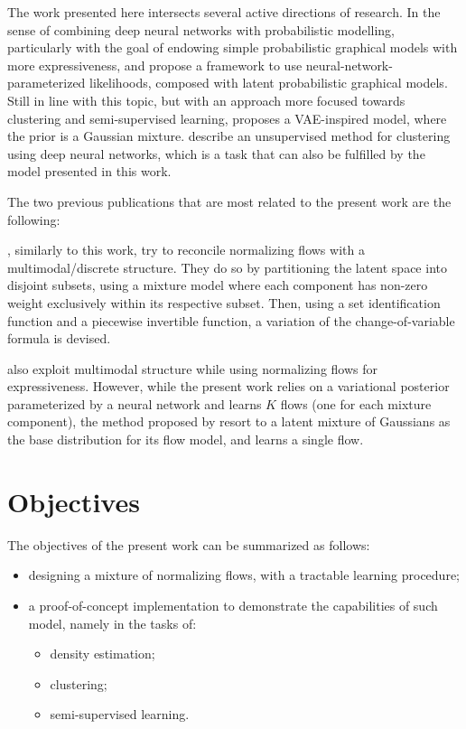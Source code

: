 The work presented here intersects several active directions of research.
In the sense of combining deep neural networks with probabilistic modelling,
particularly with the goal of endowing simple probabilistic graphical models
with more expressiveness, \textcite{svae} and \textcite{lin2018variational} propose a
framework to use neural-network-parameterized likelihoods, composed with latent
probabilistic graphical models. Still in line with this topic, but with an
approach more focused towards clustering and semi-supervised learning, \textcite{gmVAE}
proposes a VAE-inspired model, where the prior is a Gaussian mixture. \textcite{DEC}
describe an unsupervised method for clustering using deep neural networks, which
is a task that can also be fulfilled by the model presented in this work.

The two previous publications that are most related to the present work are
the following:

\textcite{RAD}, similarly to this work, try to reconcile normalizing flows with a
multimodal/discrete structure. They do so by partitioning the latent space into
disjoint subsets, using a mixture model where each component has non-zero
weight exclusively within its respective subset. Then, using a set identification
function and a piecewise invertible function, a variation of the change-of-variable
formula is devised.

\textcite{semisuplearning_nflows} also exploit multimodal structure while
using normalizing flows for expressiveness. However, while the present work relies on
a variational posterior parameterized by a neural network and learns $K$ flows
(one for each mixture component), the method proposed by \textcite{semisuplearning_nflows} resort to a
latent mixture of Gaussians as the base distribution for its flow model, and
learns a single flow.

\section{Objectives}
\label{section:objectives}

The objectives of the present work can be summarized as follows:
\begin{itemize}
    \item designing a mixture of normalizing flows, with a tractable learning procedure;
    \item a proof-of-concept implementation to demonstrate the capabilities of such model, namely in the tasks of:
        \begin{itemize}
        \item density estimation;
        \item clustering;
        \item semi-supervised learning.
        \end{itemize}
\end{itemize}


